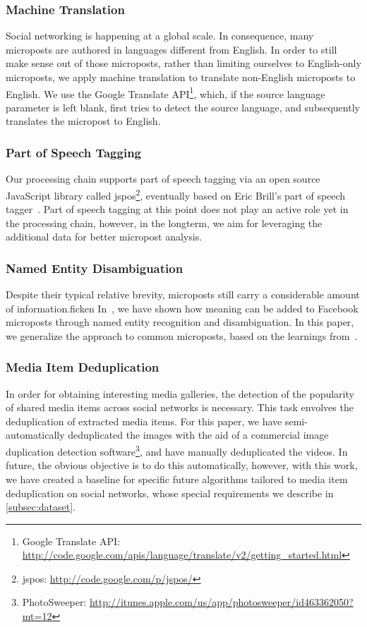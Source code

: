 \documentclass{acm_proc_article-sp}
\newcommand{\inlinelistingsize}{\fontsize{8pt}{11pt}}
\let\oldurl\url
\renewcommand{\url}[1]{\inlinelistingsize\oldurl{#1}}
\begin{document}
\subsubsection{Machine Translation}
Social networking is happening at a global scale.
In consequence, many microposts are authored in languages different from English.
In order to still make sense out of those microposts,
rather than limiting ourselves to English-only microposts,
we apply machine translation to translate non-English microposts to English.
We use the Google Translate API\footnote{Google Translate API: \url{http://code.google.com/apis/language/translate/v2/getting_started.html}},
which, if the source language parameter is left blank,
first tries to detect the source language,
and subsequently translates the micropost to English.

\subsubsection{Part of Speech Tagging}
Our processing chain supports part of speech tagging via an open source JavaScript library called jspos\footnote{jspos: \url{http://code.google.com/p/jspos/}},
eventually based on Eric Brill's part of speech tagger~\cite{brill1992simple}.
Part of speech tagging at this point does not play an active role yet in the processing chain, however,
in the longterm, we aim for leveraging the additional data for better micropost analysis.

\subsubsection{Named Entity Disambiguation}
Despite their typical relative brevity, microposts still carry a considerable amount of information.ficken
In~\cite{AddingMeaningToMicroposts}, we have shown how meaning can be added to Facebook microposts through named entity recognition and disambiguation.
In this paper, we generalize the approach to common microposts,
based on the learnings from~\cite{NERD}.

\subsubsection{Media Item Deduplication} \label{sec:deduplication}
In order for obtaining interesting media galleries,
the detection of the  popularity of shared media items across social networks is necessary.
This task envolves the deduplication of extracted media items.
For this paper, we have semi-automatically deduplicated the images with the aid of a commercial image duplication detection software\footnote{PhotoSweeper: \url{http://itunes.apple.com/us/app/photosweeper/id463362050?mt=12}}, and have manually deduplicated the videos.
In future, the obvious objective is to do this automatically, however,
with this work, we have created a baseline for specific future algorithms tailored to media item deduplication on social networks,
whose special requirements we describe in \autoref{subsec:dataset}.
\end{document}
